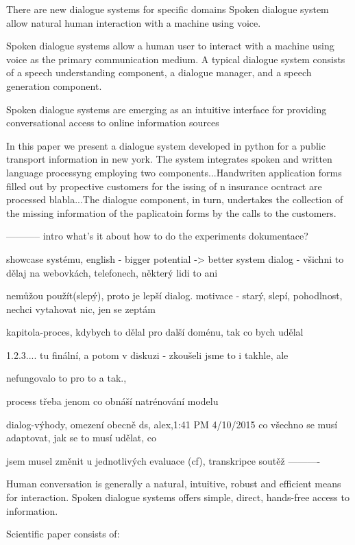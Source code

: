 There are new dialogue systems for specific domains
Spoken dialogue system allow natural human interaction with a machine using voice. 

Spoken dialogue systems allow a human user to interact with a machine using voice as the primary communication medium.
A typical dialogue system consists of a speech understanding component, a dialogue manager, and a speech generation component.

Spoken dialogue systems are emerging as an intuitive interface for providing conversational access to online information sources

In this paper we present a dialogue system developed in python for a public transport information in new york. The system integrates spoken and written language processyng employing two components...Handwriten application forms filled out by propective customers for the issing of n insurance ocntract are processed blabla...The dialogue component, in turn, undertakes the collection of the missing information of the paplicatoin forms by the calls to the customers. 

-----------
intro
what's it about
how to do the experiments
dokumentace?

showcase systému, english - bigger potential -> better system
dialog - všichni to dělaj na webovkách, telefonech, některý lidi to ani 

nemůžou použít(slepý), proto je lepší dialog. 
motivace - starý, slepí, pohodlnost, nechci vytahovat nic, jen se zeptám

kapitola-proces, kdybych to dělal pro další doménu, tak co bych udělal 

1.2.3....
tu finální, a potom v diskuzi - zkoušeli jsme to i takhle, ale 

nefungovalo to pro to a tak.,

process třeba jenom co obnáší natrénování modelu

dialog-výhody, omezení
obecně ds, alex,1:41 PM 4/10/2015 co všechno se musí adaptovat, jak se to musí udělat, co 

jsem musel změnit u jednotlivých
evaluace (cf), transkripce
soutěž
----------



Human conversation is generally a natural, intuitive, robust and efficient means for interaction.
Spoken dialogue systems offers simple, direct, hands-free access to information.



Scientific paper consists of:

